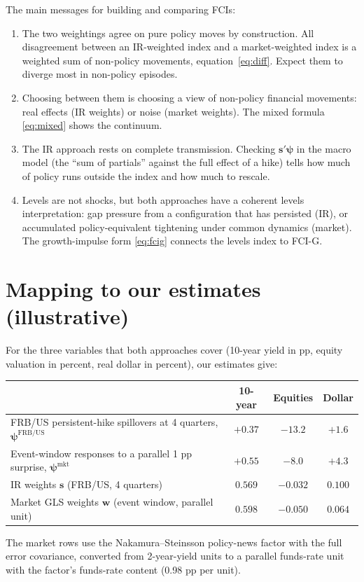 \documentclass[11pt]{article}
\theoremstyle{definition}
\theoremstyle{remark}
\newcommand{\bpsi}{\boldsymbol{\psi}}
\newcommand{\bs}{\mathbf{s}}
\newcommand{\bw}{\mathbf{w}}
\begin{document}
The main messages for building and comparing FCIs:
\begin{enumerate}[leftmargin=2em]
\item The two weightings agree on pure policy moves by construction. All disagreement between an IR-weighted index and a market-weighted index is a weighted sum of non-policy movements, equation~\eqref{eq:diff}. Expect them to diverge most in non-policy episodes.
\item Choosing between them is choosing a view of non-policy financial movements: real effects (IR weights) or noise (market weights). The mixed formula \eqref{eq:mixed} shows the continuum.
\item The IR approach rests on complete transmission. Checking $\bs'\bpsi$ in the macro model (the ``sum of partials'' against the full effect of a hike) tells how much of policy runs outside the index and how much to rescale.
\item Levels are not shocks, but both approaches have a coherent levels interpretation: gap pressure from a configuration that has persisted (IR), or accumulated policy-equivalent tightening under common dynamics (market). The growth-impulse form \eqref{eq:fcig} connects the levels index to FCI-G.
\end{enumerate}

\section{Mapping to our estimates (illustrative)}

For the three variables that both approaches cover (10-year yield in pp, equity valuation in percent, real dollar in percent), our estimates give:

\begin{center}
\small
\begin{tabular}{lccc}
\toprule
 & 10-year & Equities & Dollar \\
\midrule
FRB/US persistent-hike spillovers at 4 quarters, $\bpsi^{\text{FRB/US}}$ & $+0.37$ & $-13.2$ & $+1.6$ \\
Event-window responses to a parallel 1 pp surprise, $\bpsi^{\text{mkt}}$ & $+0.55$ & $-8.0$ & $+4.3$ \\
IR weights $\bs$ (FRB/US, 4 quarters) & $0.569$ & $-0.032$ & $0.100$ \\
Market GLS weights $\bw$ (event window, parallel unit) & $0.598$ & $-0.050$ & $0.064$ \\
\bottomrule
\end{tabular}
\end{center}
\noindent The market rows use the Nakamura--Steinsson policy-news factor with the full error covariance, converted from 2-year-yield units to a parallel funds-rate unit with the factor's funds-rate content (0.98 pp per unit).
\end{document}
